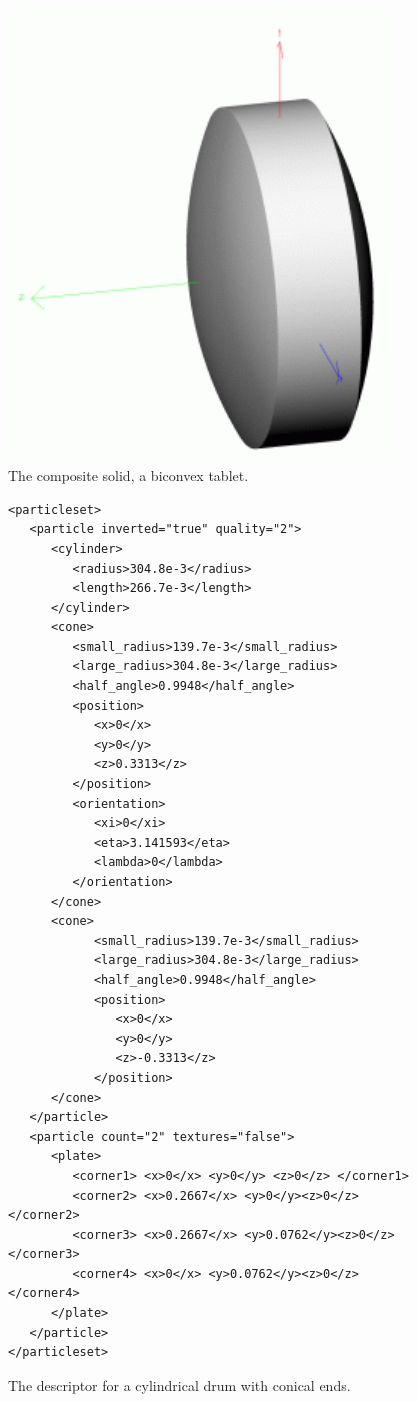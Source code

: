 \begin{figure}[htbp]%
 \centering
 \includegraphics[width=4.0in]{pics/tablet.png}
 \caption[The composite solid, a biconvex tablet]{The composite solid, a biconvex tablet.}
 \label{fig:Biconvex}
\end{figure}

\begin{figure}
\begin{scriptsize}
\begin{verbatim}
<particleset>
   <particle inverted="true" quality="2">
      <cylinder>
         <radius>304.8e-3</radius>
         <length>266.7e-3</length>
      </cylinder>
      <cone>
         <small_radius>139.7e-3</small_radius>
         <large_radius>304.8e-3</large_radius>
         <half_angle>0.9948</half_angle>
         <position>
            <x>0</x>
            <y>0</y>
            <z>0.3313</z>
         </position>
         <orientation>
            <xi>0</xi>
            <eta>3.141593</eta>
            <lambda>0</lambda>
         </orientation>
      </cone>
      <cone>
            <small_radius>139.7e-3</small_radius>
            <large_radius>304.8e-3</large_radius>
            <half_angle>0.9948</half_angle>
            <position>
               <x>0</x>
               <y>0</y>
               <z>-0.3313</z>
            </position>
      </cone>
   </particle>
   <particle count="2" textures="false">
      <plate>
         <corner1> <x>0</x> <y>0</y> <z>0</z> </corner1>
         <corner2> <x>0.2667</x> <y>0</y><z>0</z> </corner2>
         <corner3> <x>0.2667</x> <y>0.0762</y><z>0</z> </corner3>
         <corner4> <x>0</x> <y>0.0762</y><z>0</z> </corner4>
      </plate>
   </particle>
</particleset>
\end{verbatim}
\end{scriptsize}
 \caption[The descriptor for a cylindrical drum with conical ends]{The descriptor for a cylindrical drum with conical ends.}
 \label{fig:drum}
\end{figure}

